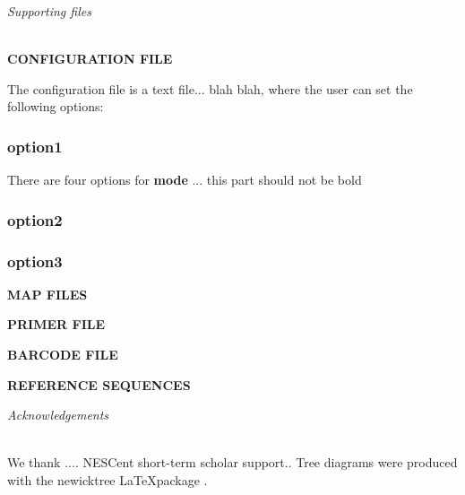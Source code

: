 \documentclass[12pt,letterpaper]{article}
\renewcommand{\section}[1]{
\bigskip
\noindent
\begin{Large}
\textit{\textsf{#1}}
\medskip
\end{Large}
}
\renewcommand{\subsection}[1]{
\bigskip
\noindent
\textsf{\textbf{\MakeUppercase{#1}}}
}
\begin{document}
\bigskip\section{Supporting files}\\
\subsection{Configuration file}
The configuration file is a text file... blah blah, where the user can
set the following options:

\subsubsection{option1}
There are four options for \textbf{mode} ... this part should not be bold

\subsubsection{option2}

\subsubsection{option3}

\subsection{Map files}

\subsection{Primer file}

\subsection{Barcode file}

\subsection{Reference sequences}





\bigskip\section{Acknowledgements}\\
We thank .... NESCent short-term scholar support.. Tree diagrams were
produced with the \textsf{newicktree} \LaTeX package \citep{Savva:2004}.
\end{document}

